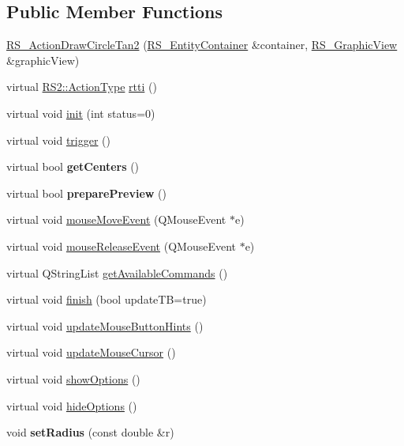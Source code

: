\subsection*{Public Member Functions}
\begin{DoxyCompactItemize}
\item 
\hyperlink{classRS__ActionDrawCircleTan2_ae5ee5a94939a8307f4cdaeedf7e6cd00}{R\-S\-\_\-\-Action\-Draw\-Circle\-Tan2} (\hyperlink{classRS__EntityContainer}{R\-S\-\_\-\-Entity\-Container} \&container, \hyperlink{classRS__GraphicView}{R\-S\-\_\-\-Graphic\-View} \&graphic\-View)
\item 
virtual \hyperlink{classRS2_afe3523e0bc41fd637b892321cfc4b9d7}{R\-S2\-::\-Action\-Type} \hyperlink{classRS__ActionDrawCircleTan2_a06c23a224a6e7ffe7d50a83e6e8c5010}{rtti} ()
\item 
virtual void \hyperlink{classRS__ActionDrawCircleTan2_a9e18991f44f3e9e43266c400ed1afd0f}{init} (int status=0)
\item 
virtual void \hyperlink{classRS__ActionDrawCircleTan2_a9e4b34ef1ad85630c5fd1ed9b4fa9a4b}{trigger} ()
\item 
\hypertarget{classRS__ActionDrawCircleTan2_ac0b6adca2aa46ee5b9ac409dc95c3c56}{virtual bool {\bfseries get\-Centers} ()}\label{classRS__ActionDrawCircleTan2_ac0b6adca2aa46ee5b9ac409dc95c3c56}

\item 
\hypertarget{classRS__ActionDrawCircleTan2_a0e1b0a3ee541d8334fa43e515602afe5}{virtual bool {\bfseries prepare\-Preview} ()}\label{classRS__ActionDrawCircleTan2_a0e1b0a3ee541d8334fa43e515602afe5}

\item 
virtual void \hyperlink{classRS__ActionDrawCircleTan2_a17569ba118af480244ac6c11896770f0}{mouse\-Move\-Event} (Q\-Mouse\-Event $\ast$e)
\item 
virtual void \hyperlink{classRS__ActionDrawCircleTan2_ad11b5f2367ed88b9e25b9c45d4f6b739}{mouse\-Release\-Event} (Q\-Mouse\-Event $\ast$e)
\item 
virtual Q\-String\-List \hyperlink{classRS__ActionDrawCircleTan2_a3d4f018fa942512f9272bf103d2313e2}{get\-Available\-Commands} ()
\item 
virtual void \hyperlink{classRS__ActionDrawCircleTan2_aa905732fa5455f65afc756f9c67dd3e4}{finish} (bool update\-T\-B=true)
\item 
virtual void \hyperlink{classRS__ActionDrawCircleTan2_a62c941466182dcaad184622b7eff2317}{update\-Mouse\-Button\-Hints} ()
\item 
virtual void \hyperlink{classRS__ActionDrawCircleTan2_a3e0b84f31df52afd1218436b9c9cd20a}{update\-Mouse\-Cursor} ()
\item 
virtual void \hyperlink{classRS__ActionDrawCircleTan2_add5a44d8b9f532dfda715a37b5a0a1f1}{show\-Options} ()
\item 
virtual void \hyperlink{classRS__ActionDrawCircleTan2_ac74d79fa7a49549a54b3056d44e1b991}{hide\-Options} ()
\item 
\hypertarget{classRS__ActionDrawCircleTan2_a91ff460ee640b4f8903ed2c50094e6f2}{void {\bfseries set\-Radius} (const double \&r)}\label{classRS__ActionDrawCircleTan2_a91ff460ee640b4f8903ed2c50094e6f2}


\end{DoxyCompactItemize}
